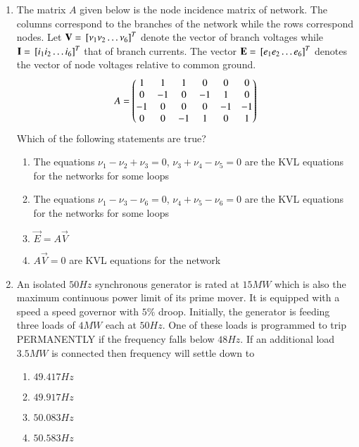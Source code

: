 \documentclass[journal]{IEEEtran}
\numberwithin{equation}{enumi}
\numberwithin{figure}{enumi}
\begin{document}
\begin{enumerate}
    \item 
    The matrix $A$ given below is the node incidence matrix of  network. The columns correspond to the branches of the network while the rows correspond nodes. Let $\mathbf{V} = {}\left[\nu_1 \nu_2 \dots \nu_6\right]^T$ denote the vector of branch voltages while $\mathbf{I} = {}\left[i_1 i_2 \dots i_6\right]^T$ that of branch currents. The vector $\mathbf{E} = {}\left[e_1 e_2 \dots e_6\right]^T$ denotes the vector of node voltages relative to common ground. 
    \begin{align*}
        A = \begin{pmatrix}1 & 1 & 1 & 0 & 0 & 0 \\ 0 & -1 & 0 & -1 & 1 & 0 \\ -1 & 0 & 0 & 0 & -1 & -1\\ 0 & 0 & -1 & 1 & 0 & 1\end{pmatrix}
    \end{align*}
    Which of the following statements are true?
    \begin{enumerate}
        \item The equations $\nu_1 - \nu_2 + \nu_3 = 0$, $\nu_3 + \nu_4 - \nu_5 = 0$ are the KVL equations for the networks for some loops 
        \item The equations $\nu_1 - \nu_3 - \nu_6 = 0$, $\nu_4 + \nu_5 - \nu_6 = 0$ are the KVL equations for the networks for some loops
        \item $\vec{E} = A\vec{V}$
        \item $A\vec{V} = 0$ are KVL equations for the network
    \end{enumerate}

    \item 
    An isolated $50Hz$ synchronous generator is rated at $15MW$ which is also the maximum continuous power limit of its prime mover. It is equipped with a speed a speed governor with $5\%$ droop. Initially, the generator is feeding three loads of $4MW$ each at $50Hz$. One of these loads is programmed to trip PERMANENTLY if the frequency falls below $48Hz$. If an additional load $3.5MW$ is connected then frequency will settle down to
    \begin{multicols}{4}
        \begin{enumerate}
            \item $49.417Hz$
            \item $49.917Hz$
            \item $50.083Hz$
            \item $50.583Hz$
        \end{enumerate}
    \end{multicols}
    
\end{enumerate}
\end{document}
